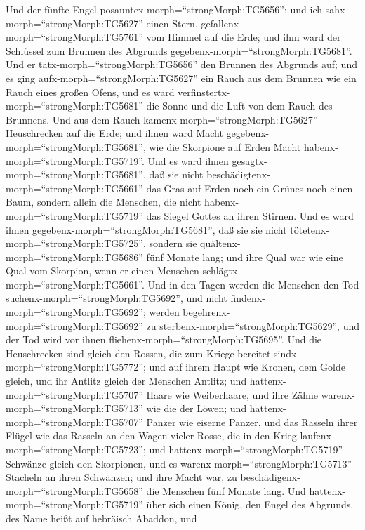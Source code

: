  Und der fünfte Engel
posauntex-morph=``strongMorph:TG5656'': und ich
sahx-morph=``strongMorph:TG5627'' einen Stern,
gefallenx-morph=``strongMorph:TG5761'' vom Himmel auf die Erde; und ihm
ward der Schlüssel zum Brunnen des Abgrunds
gegebenx-morph=``strongMorph:TG5681''.  Und er
tatx-morph=``strongMorph:TG5656'' den Brunnen des Abgrunds auf; und es
ging aufx-morph=``strongMorph:TG5627'' ein Rauch aus dem Brunnen wie ein
Rauch eines großen Ofens, und es ward
verfinstertx-morph=``strongMorph:TG5681'' die Sonne und die Luft von dem
Rauch des Brunnens.  Und aus dem Rauch
kamenx-morph=``strongMorph:TG5627'' Heuschrecken auf die Erde; und ihnen
ward Macht gegebenx-morph=``strongMorph:TG5681'', wie die Skorpione auf
Erden Macht habenx-morph=``strongMorph:TG5719''.  Und es
ward ihnen gesagtx-morph=``strongMorph:TG5681'', daß sie nicht
beschädigtenx-morph=``strongMorph:TG5661'' das Gras auf Erden noch ein
Grünes noch einen Baum, sondern allein die Menschen, die nicht
habenx-morph=``strongMorph:TG5719'' das Siegel Gottes an ihren Stirnen.
 Und es ward ihnen gegebenx-morph=``strongMorph:TG5681'',
daß sie sie nicht tötetenx-morph=``strongMorph:TG5725'', sondern sie
quältenx-morph=``strongMorph:TG5686'' fünf Monate lang; und ihre Qual
war wie eine Qual vom Skorpion, wenn er einen Menschen
schlägtx-morph=``strongMorph:TG5661''.  Und in den Tagen
werden die Menschen den Tod suchenx-morph=``strongMorph:TG5692'', und
nicht findenx-morph=``strongMorph:TG5692''; werden
begehrenx-morph=``strongMorph:TG5692'' zu
sterbenx-morph=``strongMorph:TG5629'', und der Tod wird vor ihnen
fliehenx-morph=``strongMorph:TG5695''.  Und die Heuschrecken
sind gleich den Rossen, die zum Kriege bereitet
sindx-morph=``strongMorph:TG5772''; und auf ihrem Haupt wie Kronen, dem
Golde gleich, und ihr Antlitz gleich der Menschen Antlitz; 
und hattenx-morph=``strongMorph:TG5707'' Haare wie Weiberhaare, und ihre
Zähne warenx-morph=``strongMorph:TG5713'' wie die der Löwen;
 und hattenx-morph=``strongMorph:TG5707'' Panzer wie eiserne
Panzer, und das Rasseln ihrer Flügel wie das Rasseln an den Wagen vieler
Rosse, die in den Krieg laufenx-morph=``strongMorph:TG5723'';
 und hattenx-morph=``strongMorph:TG5719'' Schwänze gleich
den Skorpionen, und es warenx-morph=``strongMorph:TG5713'' Stacheln an
ihren Schwänzen; und ihre Macht war, zu
beschädigenx-morph=``strongMorph:TG5658'' die Menschen fünf Monate lang.
 Und hattenx-morph=``strongMorph:TG5719'' über sich einen
König, den Engel des Abgrunds, des Name heißt auf hebräisch Abaddon, und
